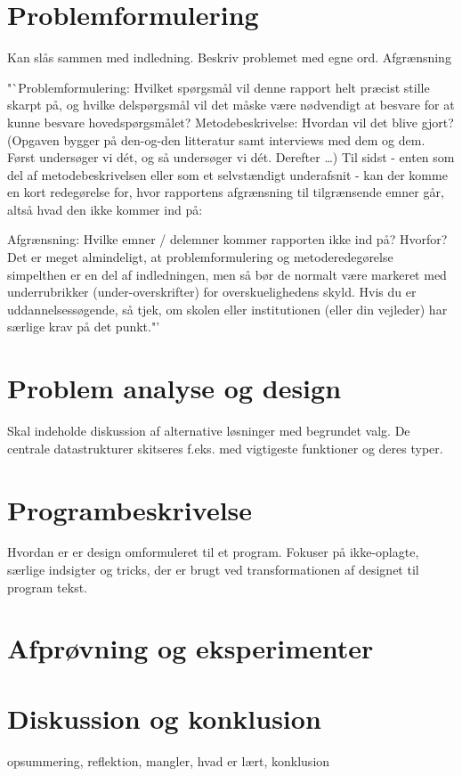 \documentclass[a4paper]{report}
\begin{document}
\section{Problemformulering}
Kan slås sammen med indledning. Beskriv problemet med egne ord. Afgrænsning

"`Problemformulering: Hvilket spørgsmål vil denne rapport helt præcist stille skarpt på, og hvilke delspørgsmål vil det måske være nødvendigt at besvare for at kunne besvare hovedspørgsmålet?
Metodebeskrivelse: Hvordan vil det blive gjort? (Opgaven bygger på den-og-den litteratur samt interviews med dem og dem. Først undersøger vi dét, og så undersøger vi dét. Derefter …)
Til sidst - enten som del af metodebeskrivelsen eller som et selvstændigt underafsnit - kan der komme en kort redegørelse for, hvor rapportens afgrænsning til tilgrænsende emner går, altså hvad den ikke kommer ind på:

Afgrænsning: Hvilke emner / delemner kommer rapporten ikke ind på? Hvorfor?
Det er meget almindeligt, at problemformulering og metoderedegørelse simpelthen er en del af indledningen, men så bør de normalt være markeret med underrubrikker (under-overskrifter) for overskuelighedens skyld. Hvis du er uddannelsessøgende, så tjek, om skolen eller institutionen (eller din vejleder) har særlige krav på det punkt."'

\section{Problem analyse og design}
Skal indeholde diskussion af alternative løsninger med begrundet
valg. De centrale datastrukturer skitseres f.eks. med vigtigeste
funktioner og deres typer.

\section{Programbeskrivelse}
Hvordan er er design omformuleret til et program. Fokuser på
ikke-oplagte, særlige indsigter og tricks, der er brugt ved
transformationen af designet til program tekst.

\section{Afprøvning og eksperimenter}

\section{Diskussion og konklusion}
opsummering, reflektion, mangler, hvad er lært, konklusion
\end{document}
